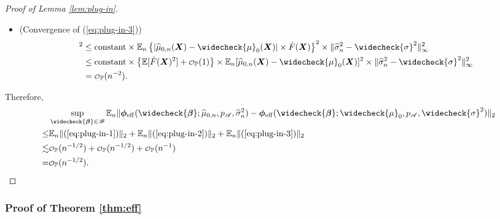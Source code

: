 \documentclass[11pt]{article}
\numberwithin{equation}{section}
\theoremstyle{definition}
\theoremstyle{remark}
\newcommand{\bX}{\bm{X}}
\newcommand{\bbeta}{\bm{\beta}}
\newcommand{\bphi}{\bm{\phi}}
\newcommand{\bbE}{\mathbb{E}}
\newcommand{\bbP}{\mathbb{P}}
\newcommand{\sA}{\mathscr{A}}
\newcommand{\sB}{\mathscr{B}}
\newcommand\smallcO{
	\mathchoice
	{{\scriptstyle\mathcal{O}}}%
	{{\scriptstyle\mathcal{O}}}%
	{{\scriptscriptstyle\mathcal{O}}}%
	{\scalebox{.5}{$\scriptscriptstyle\mathcal{O}$}}%
}
\newcommand{\eff}{\mathrm{eff}}
\begin{document}
\begin{proof}[Proof of Lemma \ref{lem:plug-in}]
\begin{itemize}[leftmargin=*]
		\item (Convergence of (\ref{eq:plug-in-3}))
		\begin{align*}
			[\bbE_{n}\| (\ref{eq:plug-in-3}) \|_{2}]^{2} &\le \text{constant} \times \bbE_{n}\left\{ \left| \widehat{\mu}_{0,n}(\bX) - \widecheck{\mu}_{0}(\bX) \right| \times \dot{F}(\bX) \right\}^{2} \times \| \widehat{\sigma}_{n}^{2} - \widecheck{\sigma}^{2} \|_{\infty}^{2} \\
			&\le \text{constant} \times \left\{ \bbE[\dot{F}(\bX)^{2}] + \smallcO_{\bbP}(1) \right\} \times \bbE_{n}[\widehat{\mu}_{0,n}(\bX) - \widecheck{\mu}_{0}(\bX)]^{2} \times \| \widehat{\sigma}_{n}^{2} - \widecheck{\sigma}^{2} \|_{\infty}^{2} \\
			&= \smallcO_{\bbP}(n^{-2}).
		\end{align*}
	\end{itemize}
	Therefore,
	\begin{align*}
		& \sup_{\widecheck{\bbeta} \in \sB}\bbE_{n}\| \bphi_{\eff}(\widecheck{\bbeta};\widehat{\mu}_{0,n},p_{\sA},\widehat{\sigma}_{n}^{2}) - \bphi_{\eff}(\widecheck{\bbeta};\widecheck{\mu}_{0},p_{\sA},\widecheck{\sigma}^{2}) \|_{2}\\
		\le & \bbE_{n}\| (\ref{eq:plug-in-1}) \|_{2} + \bbE_{n}\| (\ref{eq:plug-in-2}) \|_{2} + \bbE_{n}\| (\ref{eq:plug-in-3}) \|_{2}\\
		\lesssim & \smallcO_{\bbP}(n^{-1/2}) + \smallcO_{\bbP}(n^{-1/2}) + \smallcO_{\bbP}(n^{-1})\\
		=& \smallcO_{\bbP}(n^{-1/2}).
	\end{align*}
\end{proof}

\subsubsection{Proof of Theorem \ref{thm:eff}}
\end{document}

